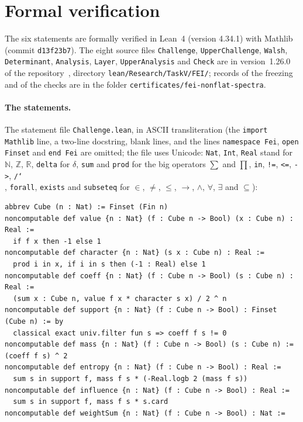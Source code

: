 \documentclass[11pt]{article}
\theoremstyle{definition}
\theoremstyle{remark}
\newcommand{\repoversion}{1.26.0}
\newcommand{\Z}{\mathbb Z}
\newcommand{\R}{\mathbb R}
\begin{document}
\section{Formal verification}\label{sec:lean}

{\sloppy
The six statements are formally verified in Lean~4 (version 4.34.1) with
Mathlib~\cite{mathlib} (commit \texttt{d13f23b7}). The eight source files
\texttt{Challenge}, \texttt{UpperChallenge}, \texttt{Walsh},
\texttt{Determinant}, \texttt{Analysis}, \texttt{Layer},
\texttt{UpperAnalysis} and \texttt{Check} are in version~\repoversion{} of the
repository~\cite{repo}, directory \texttt{lean/Research/TaskV/FEI/}; records of
the freezing and of the checks are in the folder
\texttt{certificates/fei-nonflat-spectra}.

\paragraph{The statements.} The statement file \texttt{Challenge.lean}, in ASCII
transliteration (the \texttt{import Mathlib} line, a two-line docstring, blank
lines, and
the lines \texttt{namespace Fei}, \texttt{open Finset} and \texttt{end Fei} are
omitted; the file uses Unicode: \texttt{Nat}, \texttt{Int}, \texttt{Real} stand
for $\mathbb N$, $\Z$, $\R$, \texttt{delta} for $\delta$, \texttt{sum} and
\texttt{prod} for the big operators $\sum$ and $\prod$, \texttt{in},
\texttt{!=}, \texttt{<=}, \texttt{->}, \texttt{/\char`\\}, \texttt{forall},
\texttt{exists} and \texttt{subseteq} for $\in$, $\ne$, $\le$, $\to$, $\wedge$,
$\forall$, $\exists$ and $\subseteq$):
{\scriptsize
\begin{verbatim}
abbrev Cube (n : Nat) := Finset (Fin n)
noncomputable def value {n : Nat} (f : Cube n -> Bool) (x : Cube n) : Real :=
  if f x then -1 else 1
noncomputable def character {n : Nat} (s x : Cube n) : Real :=
  prod i in x, if i in s then (-1 : Real) else 1
noncomputable def coeff {n : Nat} (f : Cube n -> Bool) (s : Cube n) : Real :=
  (sum x : Cube n, value f x * character s x) / 2 ^ n
noncomputable def support {n : Nat} (f : Cube n -> Bool) : Finset (Cube n) := by
  classical exact univ.filter fun s => coeff f s != 0
noncomputable def mass {n : Nat} (f : Cube n -> Bool) (s : Cube n) := (coeff f s) ^ 2
noncomputable def entropy {n : Nat} (f : Cube n -> Bool) : Real :=
  sum s in support f, mass f s * (-Real.logb 2 (mass f s))
noncomputable def influence {n : Nat} (f : Cube n -> Bool) : Real :=
  sum s in support f, mass f s * s.card
noncomputable def weightSum {n : Nat} (f : Cube n -> Bool) : Nat :=

\end{verbatim}}}
\end{document}
